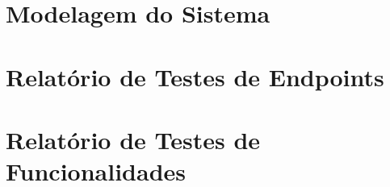 \documentclass[12pt, a4paper]{article}
\begin{document}
	\section{Modelagem do Sistema}
	
	
	\section{Relatório de Testes de Endpoints}
	
	
	\section{Relatório de Testes de Funcionalidades}
	
	
\newpage

\nocite{*} %

	
\end{document}
